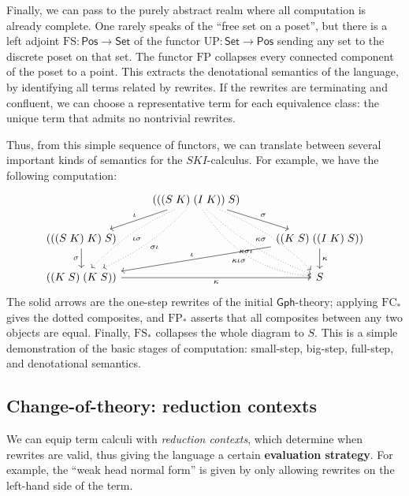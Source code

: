 \documentclass{amsart}
\theoremstyle{definition}
\newcommand{\Gph}{\mathsf{Gph}}
\newcommand{\Set}{\mathsf{Set}}
\newcommand{\Pos}{\mathsf{Pos}}
\newcommand{\FC}{\mathrm{FC}}
\newcommand{\FP}{\mathrm{FP}}
\newcommand{\FS}{\mathrm{FS}}
\newcommand{\UP}{\mathrm{UP}}
\newcommand{\maps}{\colon}
\begin{document}
Finally, we can pass to the purely abstract realm where all computation is already complete.   One rarely speaks of the ``free set on a poset'', but there is a left adjoint $\FS\maps \Pos \to \Set$ of the functor $\UP \maps \Set \to \Pos$ sending any set to the discrete poset on that set.
The functor $\FP$ collapses every connected component of the poset to a point.   This extracts
the denotational semantics of the language, by identifying all terms related by rewrites.  If the rewrites are terminating and confluent, we can choose a representative term for each equivalence class: the unique term that admits no nontrivial rewrites.

Thus, from this simple sequence of functors, we can translate between several important kinds of semantics for the $SKI$-calculus. For example, we have the following computation:
\[\begin{tikzcd}
&	(((S\; K)\; (I\; K))\; S) \arrow[rd,"\sigma"] \arrow[ld,swap,"\iota"] \arrow[ddl,dotted,bend left=10,"\sigma\iota"] \arrow[ddl,dotted,bend right=10,"\iota\sigma"] \arrow[ddr,dotted,swap,bend left=10,"\kappa\sigma"] \arrow[ddr,dotted,bend right=10,swap,"\kappa\sigma\iota"] \arrow[ddr,dotted,swap,bend right=25,"\kappa\iota\sigma"] &\\
(((S\; K)\; K)\; S) \arrow[d,swap,"\sigma"] & & ((K\; S)\; ((I\; K)\; S)) \arrow[lld,swap,"\iota"] \arrow[d,"\kappa"]\\
((K\; S)\; (K\; S)) \arrow[rr,swap,"\kappa"] & & S
\end{tikzcd}\]
The solid arrows are the one-step rewrites of the initial $\Gph$-theory; applying $\FC_*$ gives the dotted composites, and $\FP_*$ asserts that all composites between any two objects are equal. Finally, $\FS_*$ collapses the whole diagram to $S$. This is a simple demonstration of the basic stages of computation: small-step, big-step, full-step, and denotational semantics.

\subsection{Change-of-theory: reduction contexts}

We can equip term calculi with \textit{reduction contexts}, which determine when rewrites are valid, thus giving the language a certain \textbf{evaluation strategy}. For example, the ``weak head normal form'' is given by only allowing rewrites on the left-hand side of the term.
\end{document}
